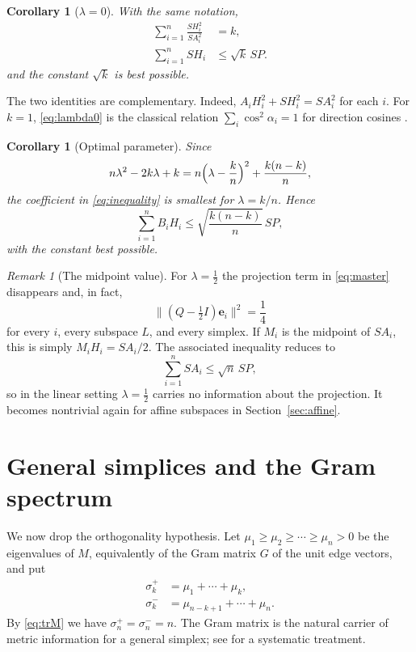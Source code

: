 \documentclass[11pt]{article}
\newtheorem{corollary}[theorem]{Corollary}
\theoremstyle{definition}
\theoremstyle{remark}
\newtheorem{remark}[theorem]{Remark}
\newcommand{\be}{\mathbf e}
\newcommand{\norm}[1]{\lVert #1 \rVert}
\begin{document}
\begin{corollary}[$\lambda=0$]\label{cor:lambda0}
With the same notation,
\begin{equation}\label{eq:lambda0}
\begin{aligned}
\sum_{i=1}^{n}\frac{SH_i^{2}}{SA_i^{2}}&=k,\\
\sum_{i=1}^{n}SH_i&\le\sqrt{k}\,SP.
\end{aligned}
\end{equation}
and the constant $\sqrt{k}$ is best possible.
\end{corollary}

The two identities are complementary. Indeed,
$A_iH_i^2+SH_i^2=SA_i^2$ for each $i$. For $k=1$, \eqref{eq:lambda0} is the classical
relation $\sum_i\cos^2\alpha_i=1$ for direction cosines \cite[Ch.~18]{Coxeter}.

\begin{corollary}[Optimal parameter]\label{cor:optimal}
Since
\[
n\lambda^{2}-2k\lambda+k
=
n\Bigl(\lambda-\frac{k}{n}\Bigr)^2+\frac{k(n-k)}{n},
\]
the coefficient in \eqref{eq:inequality} is smallest for $\lambda=k/n$. Hence
\[
\sum_{i=1}^{n}B_iH_i
\le
\sqrt{\frac{k(n-k)}{n}}\,SP,
\]
with the constant best possible.
\end{corollary}

\begin{remark}[The midpoint value]\label{rem:midpoint}
For $\lambda=\tfrac12$ the projection term in \eqref{eq:master} disappears and, in fact,
\[
\norm{(Q-\tfrac12 I)\be_i}^2=\frac14
\]
for every $i$, every subspace $L$, and every simplex. If $M_i$ is the midpoint of $SA_i$,
this is simply $M_iH_i=SA_i/2$. The associated inequality reduces to
\[
\sum_{i=1}^{n}SA_i\le\sqrt n\,SP,
\]
so in the linear setting $\lambda=\tfrac12$ carries no information about the projection.
It becomes nontrivial again for affine subspaces in Section~\ref{sec:affine}.
\end{remark}

\section{General simplices and the Gram spectrum}\label{sec:gram}

We now drop the orthogonality hypothesis. Let $\mu_1\ge\mu_2\ge\cdots\ge\mu_n>0$ be the
eigenvalues of $M$, equivalently of the Gram matrix $G$ of the unit edge vectors, and put
\[
\begin{aligned}
\sigma_k^{+}&=\mu_1+\cdots+\mu_k,\\
\sigma_k^{-}&=\mu_{n-k+1}+\cdots+\mu_n.
\end{aligned}
\]
By \eqref{eq:trM} we have $\sigma_n^{+}=\sigma_n^{-}=n$. The Gram matrix is the natural
carrier of metric information for a general simplex; see \cite{Fiedler} for a systematic
treatment.
\end{document}
